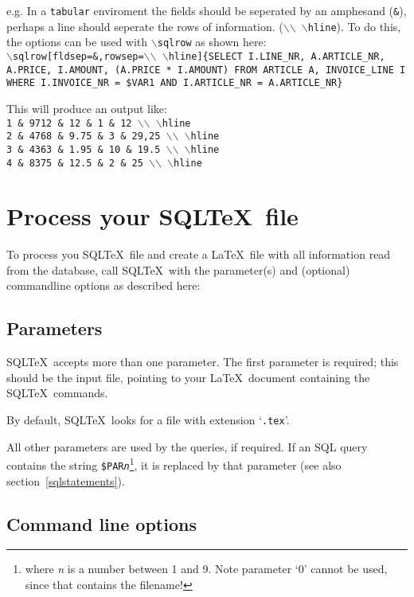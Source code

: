 \documentclass{article}
\newcommand{\bs}{\ensuremath{\backslash}}
\newcommand{\vs}{\vspace{3mm}}
\begin{document}
e.g. In a \texttt{tabular} enviroment the fields should be seperated by an amphesand (\texttt{\&}),
perhaps a line should seperate the rows of information. (\texttt{\bs\bs~\bs hline}).
To do this, the options can be used with \texttt{\bs sqlrow} as shown here: \\
\texttt{\bs sqlrow[fldsep=\&,rowsep=\bs\bs~\bs hline]\{SELECT I.LINE\_NR, A.ARTICLE\_NR, 
A.PRICE, I.AMOUNT, (A.PRICE * I.AMOUNT) FROM ARTICLE A, INVOICE\_LINE I WHERE I.INVOICE\_NR = \$VAR1 
AND I.ARTICLE\_NR = A.ARTICLE\_NR\}}

\vs

This will produce an output like: \\
\texttt{1 \& 9712 \& 12 \& 1 \& 12 \bs\bs~\bs hline \\
2 \& 4768 \& 9.75 \& 3 \& 29,25 \bs\bs~\bs hline \\
3 \& 4363 \& 1.95 \& 10 \& 19.5 \bs\bs~\bs hline \\
4 \& 8375 \& 12.5 \& 2 \& 25 \bs\bs~\bs hline}


\section{Process your SQL\TeX\ file}

To process you SQL\TeX\ file and create a \LaTeX\ file with all information read from
the database, call SQL\TeX\ with the parameter(s) and (optional) commandline options as
described here:

\subsection{Parameters}\label{params}

SQL\TeX\ accepts more than one parameter. The first parameter is required; this should
be the input file, pointing to your \LaTeX\ document containing the SQL\TeX\ commands.

By default, SQL\TeX\ looks for a file with extension `\texttt{.tex}'.

\vs

All other parameters are used by the queries, if required. If an SQL query contains the
string \texttt{\$PAR\textit{n}}\footnote{where \textit{n} is a number between 1 and 9. Note 
parameter `0' cannot be used, since that contains the filename!}, it is replaced by that parameter
(see also section~\ref{sqlstatements}).

\subsection{Command line options}\label{cmdline}
\end{document}
